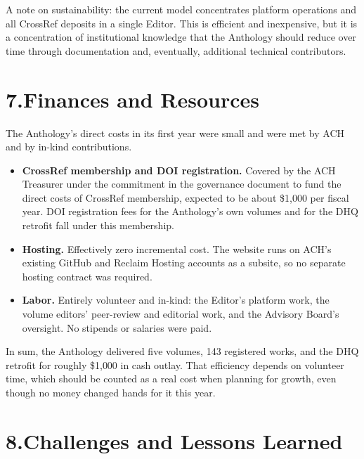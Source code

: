 \documentclass[11pt]{article}
\begin{document}
A note on sustainability: the current model concentrates platform operations and all CrossRef deposits in a single Editor. This is efficient and inexpensive, but it is a concentration of institutional knowledge that the Anthology should reduce over time through documentation and, eventually, additional technical contributors.

\section*{7.\quad Finances and Resources}

The Anthology's direct costs in its first year were small and were met by ACH and by in-kind contributions.

\begin{itemize}[leftmargin=1.5em]
\item \textbf{CrossRef membership and DOI registration.} Covered by the ACH Treasurer under the commitment in the governance document to fund the direct costs of CrossRef membership, expected to be about \$1{,}000 per fiscal year. DOI registration fees for the Anthology's own volumes and for the DHQ retrofit fall under this membership.
\item \textbf{Hosting.} Effectively zero incremental cost. The website runs on ACH's existing GitHub and Reclaim Hosting accounts as a subsite, so no separate hosting contract was required.
\item \textbf{Labor.} Entirely volunteer and in-kind: the Editor's platform work, the volume editors' peer-review and editorial work, and the Advisory Board's oversight. No stipends or salaries were paid.
\end{itemize}

In sum, the Anthology delivered five volumes, 143 registered works, and the DHQ retrofit for roughly \$1{,}000 in cash outlay. That efficiency depends on volunteer time, which should be counted as a real cost when planning for growth, even though no money changed hands for it this year.

\section*{8.\quad Challenges and Lessons Learned}
\end{document}
